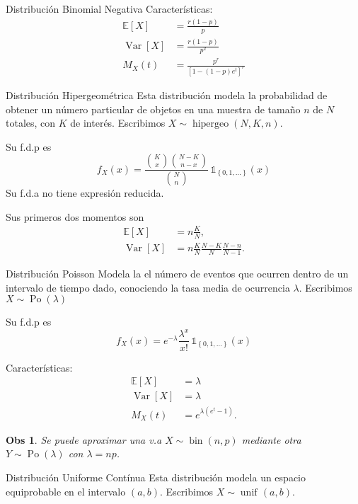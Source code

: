 \documentclass[a4paper]{article}
\theoremstyle{mytheoremstyle}
\newtheorem*{obs}{Obs}
\newcommand{\E}{\mathbb{E}}
\newcommand{\1}{\mathds{1}}
\providecommand{\set}[1]{\left\{#1\right\}}
\DeclareMathOperator{\Var}{Var}
\DeclareMathOperator{\unif}{unif\!}
\DeclareMathOperator{\bin}{bin}
\DeclareMathOperator{\hipergeo}{hipergeo}
\DeclareMathOperator{\Po}{Po}
\begin{document}
\begin{multicols*}{3}
\begin{roundbox}{Distribución Binomial Negativa}
    Características:
    \begin{align*}
        \E[X] &= \frac{r(1-p)}{p} \\
        \Var[X] &= \frac{r(1-p)}{p^2} \\
        M_X(t) &= \frac{p^{r}}{\left[1-(1-p) e^{t}\right]^{r}}
    \end{align*}
\end{roundbox}

\begin{roundbox}{Distribución Hipergeométrica}
    Esta distribución modela la probabilidad de obtener un número particular de objetos en una muestra de tamaño $n$ de $N$ totales, con $K$ de interés. Escribimos $X \sim \hipergeo(N, K, n)$.

    Su f.d.p es 
    \[
        f_X(x) = \frac{\binom{K}{x}\binom{N-K}{n-x}}{\binom{N}{n}} \, \1_{\set{0,1, \dots}}(x)
    \]
    Su f.d.a no tiene expresión reducida. 

    Sus primeros dos momentos son
    \begin{align*}
        \E[X] &= n \frac{K}{N}, \\
        \Var[X] &= n \frac{K}{N} \frac{N-K}{N} \frac{N-n}{N-1}.
    \end{align*}
\end{roundbox}

\begin{roundbox}{Distribución Poisson}
    Modela la el número de eventos que ocurren dentro de un intervalo de tiempo dado, conociendo la tasa media de ocurrencia $\lambda$. Escribimos $X \sim \Po(\lambda)$

    Su f.d.p es 
    \[
        f_X(x) = e^{-\lambda} \frac{\lambda^x}{x!} \, \1_{\set{0,1, \dots}}(x)
    \]

    Características:
    \begin{align*}
        \E[X] &= \lambda \\
        \Var[X] &= \lambda \\
        M_X(t) &= e^{\lambda (e^t -1)}.
    \end{align*}

    \begin{obs}
        Se puede aproximar una v.a $X \sim \bin(n,p)$ mediante otra $Y \sim \Po(\lambda)$ con $\lambda = np$.
    \end{obs}
\end{roundbox}

\begin{roundbox}{Distribución Uniforme Contínua}
    Esta distribución modela un espacio equiprobable en el intervalo $(a,b)$. Escribimos $X \sim \unif(a,b)$.


\end{roundbox}
\end{multicols*}
\end{document}
